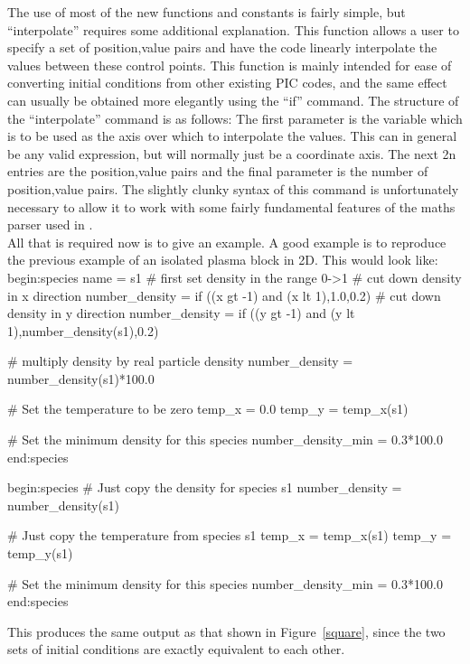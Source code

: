 \documentclass[12pt,a4paper]{article}
\newcommand{\EPOCH}{{\color{warwickdark}\fontfamily{phv}\selectfont{EPOCH}}}
\newenvironment{boxverbatim}{\lboxverbatim{none}}{\endlboxverbatim}
\begin{document}
The use of most of the new functions and constants is fairly simple, but
``interpolate'' requires some additional explanation. This function allows a
user to specify a set of position,value pairs and have the code linearly
interpolate the values between these control points. This function is mainly
intended for ease of converting initial conditions from other existing PIC
codes, and the same effect can usually be obtained more elegantly using the
``if'' command. The structure of the ``interpolate'' command is as follows:
The first parameter is the variable which is to be used as the axis over which
to interpolate the values. This can in general be any valid expression, but
will normally just be a coordinate axis. The next 2n entries are the
position,value pairs and the final parameter is the number of position,value
pairs. The slightly clunky syntax of this command is unfortunately necessary to
allow it to work with some fairly fundamental features of the maths parser
used in {\EPOCH}.\\
All that is required now is to give an example.
A good example is to reproduce
the previous example of an isolated plasma block in 2D. This would look like:
\begin{boxverbatim}
begin:species
   name = s1
   # first set density in the range 0->1
   # cut down density in x direction
   number_density = if ((x gt -1) and (x lt 1),1.0,0.2)
   # cut down density in y direction
   number_density = if ((y gt -1) and (y lt 1),number_density(s1),0.2)

   # multiply density by real particle density
   number_density = number_density(s1)*100.0

   # Set the temperature to be zero
   temp_x = 0.0
   temp_y = temp_x(s1)

   # Set the minimum density for this species
   number_density_min = 0.3*100.0
end:species

begin:species
   # Just copy the density for species s1
   number_density = number_density(s1)

   # Just copy the temperature from species s1
   temp_x = temp_x(s1)
   temp_y = temp_y(s1)

   # Set the minimum density for this species
   number_density_min = 0.3*100.0
end:species
\end{boxverbatim}

This produces the same output as that shown in Figure~\ref{square}, since
the two sets of initial conditions are exactly equivalent to each other.
\end{document}
